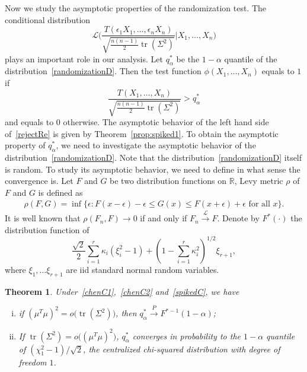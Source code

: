 \documentclass[3p]{elsarticle}
\DeclareMathOperator{\mytr}{tr}
\theoremstyle{plain}
\newtheorem{theorem}{\quad\quad Theorem}
\theoremstyle{definition}
\theoremstyle{remark}
\begin{document}
Now we study the asymptotic properties of the randomization test.
The conditional distribution
        \begin{equation}\label{randomizationD}
            \mathcal{L}\bigg(\frac{T(\epsilon_1 X_1,\ldots,\epsilon_n X_n)}{\sqrt{\frac{n(n-1)}{2}\mytr(\Sigma^2)}}\bigg|X_1,\ldots,X_n\bigg)
        \end{equation}
 plays an important role in our analysis.
Let $q_{\alpha}^*$ be the $1-\alpha$ quantile of the distribution~\eqref{randomizationD}.
Then the test function $\phi(X_1,\ldots,X_n)$ equals to $1$ if
\begin{equation}\label{rejectRe}
\frac{T(X_1,\ldots, X_n)}{\sqrt{\frac{n(n-1)}{2}\mytr(\Sigma^2)}}> q^*_{\alpha}
\end{equation}
and equals to $0$ otherwise.
The asymptotic behavior of the left hand side of~\eqref{rejectRe} is given by Theorem~\ref{prop:spiked1}.
To obtain the asymptotic property of $q^*_{\alpha}$, we need to investigate the asymptotic behavior of the distribution~\eqref{randomizationD}.
Note that the distribution~\eqref{randomizationD} itself is random.  To study its asymptotic behavior, we need to define in what sense the convergence is. Let $F$ and $G$ be two distribution functions on $\mathbb{R}$, Levy metric $\rho$ of $F$ and $G$ is defined as
    \begin{equation*}
    \begin{aligned}
        \rho(F,G)
        =\inf\{\epsilon:F(x-\epsilon)-\epsilon\leq G(x)\leq F(x+\epsilon)+\epsilon  \textrm{ for all } x\}.
    \end{aligned}
    \end{equation*}
It is well known that $\rho(F_n,F)\to 0$ if and only if  $F_n\xrightarrow{\mathcal{L}}F$.
Denote by $F^*(\cdot)$ the distribution function of
            $$
            \frac{\sqrt{2}}{2}\sum_{i=1}^r \kappa_i (\xi_i^2-1)+(1-\sum_{i=1}^r \kappa_i^2)^{1/2} \xi_{r+1},
            $$
             where $\xi_1,\ldots \xi_{r+1}$ are iid standard normal random variables.



\begin{theorem}\label{ourTheorem}
    Under~\eqref{chenC1},~\eqref{chenC2} and~\eqref{spikedC},
    we have
    \begin{enumerate}[(i)]
        \item
            if $(\mu^T \mu)^2=o\big(\mytr(\Sigma^2)\big)$, then
            $
            q_{\alpha}^*\xrightarrow{P}F^{*-1}(1-\alpha)
            $;
\item
    If $\mytr(\Sigma^2)=o\big((\mu^T \mu)^2\big)$, $q_{\alpha}^*$ converges in probability to the $1-\alpha$ quantile of  $(\chi^2_1-1)/\sqrt{2}$, the centralized chi-squared distribution with degree of freedom $1$.
    \end{enumerate}
\end{theorem}
\end{document}
